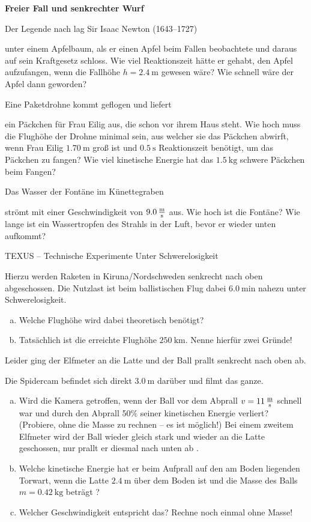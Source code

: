 \documentclass[a4paper]{article}
\begin{document}
	{\bf Freier Fall und senkrechter Wurf}

\begin{enumerate}[1.]
{\bf \item Der Legende nach lag Sir Isaac Newton (1643–1727) } unter einem Apfelbaum, als er einen Apfel beim Fallen beobachtete und daraus auf 
sein Kraftgesetz schloss. Wie viel Reaktionszeit hätte er gehabt, den Apfel aufzufangen, wenn die Fallhöhe $h=\SI{2,4}{\meter}$ gewesen wäre?
Wie schnell wäre der Apfel dann geworden?

{\bf \item Eine Paketdrohne kommt geflogen und liefert} ein Päckchen für Frau Eilig aus, die schon vor ihrem Haus steht.  Wie hoch muss die Flughöhe der Drohne minimal sein, aus welcher sie das Päckchen abwirft, wenn Frau Eilig $\SI{1,70}{\meter}$ groß ist und $\SI{0,5}{\second}$ Reaktionszeit   benötigt, um das Päckchen zu fangen? Wie viel kinetische Energie hat das $\SI{1,5}{\kilogram}$ schwere Päckchen beim Fangen?  

{\bf \item Das Wasser der Fontäne im Künettegraben} strömt mit einer Geschwindigkeit von $\SI{9,0}{\meter\over\second}$ aus. Wie hoch ist die Fontäne?
Wie lange ist ein Wassertropfen des Strahls in der Luft, bevor er wieder unten aufkommt?

{\bf \item TEXUS -- Technische Experimente Unter Schwerelosigkeit} Hierzu werden Raketen in Kiruna/Nordschweden senkrecht nach oben abgeschossen. Die Nutzlast ist beim ballistischen Flug dabei $\SI{6,0}{\minute}$ nahezu unter Schwere\-losigkeit.
\begin{enumerate}[(a)]
	\item Welche Flughöhe wird dabei theoretisch benötigt? 
	\item Tatsächlich ist die erreichte Flughöhe $\SI{250}{\kilo\meter}$. Nenne hierfür zwei Gründe! 
\end{enumerate} 

{\bf \item Leider ging der Elfmeter an die Latte und der Ball prallt senkrecht nach oben ab.} Die Spidercam befindet sich direkt $\SI{3,0}{\meter}$ darüber und filmt das ganze. 
\begin{enumerate}[(a)]
	\item Wird die Kamera getroffen, wenn der Ball vor dem Abprall $v=\SI{11}{\meter\over\second}$ schnell war und durch den Abprall 
	50\% seiner kinetischen Energie verliert?  (Probiere, ohne die Masse zu rechnen -- es ist möglich!)
Bei einem zweitem Elfmeter wird der Ball wieder gleich stark und wieder an die Latte geschossen, nur prallt er diesmal nach unten ab .
	\item Welche kinetische Energie hat er beim Aufprall auf den am Boden liegenden Torwart, wenn die Latte $\SI{2,4}{\meter}$ über dem Boden ist und die Masse des Balls $m=\SI{0,42}{\kilogram}$ beträgt ? 
	\item Welcher Geschwindigkeit entspricht das? Rechne noch einmal ohne Masse!
\end{enumerate} 



\end{enumerate}
\end{document}
